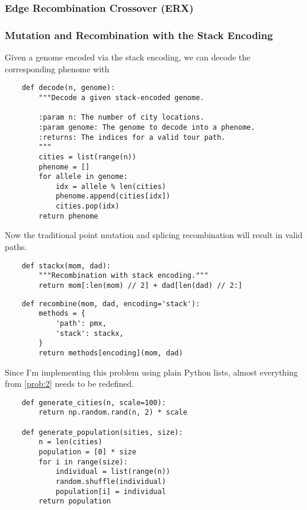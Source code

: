 \documentclass{article}
\begin{document}
\subsubsection{Edge Recombination Crossover (ERX)}

\subsubsection{Mutation and Recombination with the Stack Encoding}
Given a genome encoded via the stack encoding, we can decode the corresponding phenome with
\begin{verbatim}
    def decode(n, genome):
        """Decode a given stack-encoded genome.

        :param n: The number of city locations.
        :param genome: The genome to decode into a phenome.
        :returns: The indices for a valid tour path.
        """
        cities = list(range(n))
        phenome = []
        for allele in genome:
            idx = allele % len(cities)
            phenome.append(cities[idx])
            cities.pop(idx)
        return phenome
\end{verbatim}
Now the traditional point mutation and splicing recombination will result in valid paths.

\begin{verbatim}
    def stackx(mom, dad):
        """Recombination with stack encoding."""
        return mom[:len(mom) // 2] + dad[len(dad) // 2:]
\end{verbatim}

\begin{verbatim}
    def recombine(mom, dad, encoding='stack'):
        methods = {
            'path': pmx,
            'stack': stackx,
        }
        return methods[encoding](mom, dad)
\end{verbatim}

Since I'm implementing this problem using plain Python lists, almost everything from
\autoref{prob:2} needs to be redefined.

\begin{verbatim}
    def generate_cities(n, scale=100):
        return np.random.rand(n, 2) * scale

    def generate_population(sities, size):
        n = len(cities)
        population = [0] * size
        for i in range(size):
            individual = list(range(n))
            random.shuffle(individual)
            population[i] = individual
        return population
\end{verbatim}
\end{document}
